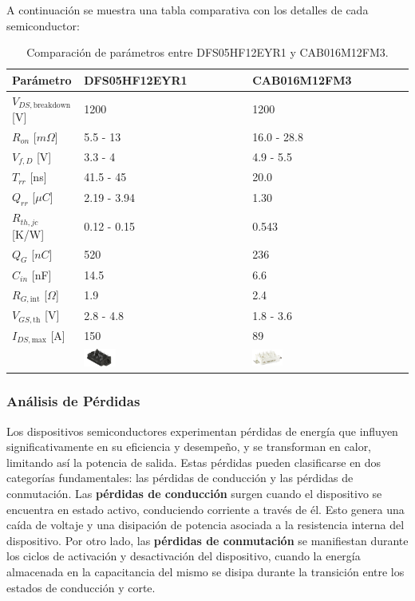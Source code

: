 A continuación se muestra una tabla comparativa con los detalles de cada semiconductor:
\begin{table}[H]
	\centering
	\begin{tabular}{|l|l|l|}
		\hline
		\textbf{Parámetro} & \textbf{DFS05HF12EYR1} & \textbf{CAB016M12FM3} \\ \hline
		\(V_{DS,\text{breakdown}}\) [V] & 1200 & 1200 \\ \hline
		\(R_{on}\) [\(m \Omega\)] & 5.5 - 13 & 16.0 - 28.8 \\ \hline
		\(V_{f,D}\) [V] & 3.3 - 4 & 4.9 - 5.5 \\ \hline
		\(T_{rr}\) [ns] & 41.5 - 45 & 20.0 \\ \hline
		\(Q_{rr}\) [\(\mu C\)] & 2.19 - 3.94 & 1.30 \\ \hline
		\(R_{th,jc}\) [K/W] & 0.12 - 0.15 & 0.543 \\ \hline
		\(Q_{G}\) [\(nC\)] & 520 & 236 \\ \hline
		\(C_{in}\) [nF] & 14.5 & 6.6 \\ \hline
		\(R_{G,\text{int}}\) [\(\Omega\)] & 1.9 & 2.4 \\ \hline
		\(V_{GS,\text{th}}\) [V] & 2.8 - 4.8 & 1.8 - 3.6 \\ \hline
		\(I_{DS,\text{max}}\) [A] & 150 & 89 \\ \hline
		& \includegraphics[width=0.2\textwidth]{fig/DFS05.png} & \includegraphics[width=0.2\textwidth]{fig/CAB016.png} \\
		\hline
	\end{tabular}
	\caption{Comparación de parámetros entre DFS05HF12EYR1 y CAB016M12FM3.}
\end{table}

\subsubsection{Análisis de Pérdidas}

Los dispositivos semiconductores experimentan pérdidas de energía que influyen significativamente en su eficiencia y desempeño, y se transforman en calor, limitando así la potencia de salida. Estas pérdidas pueden clasificarse en dos categorías fundamentales: las pérdidas de conducción y las pérdidas de conmutación. Las \textbf{pérdidas de conducción} surgen cuando el dispositivo se encuentra en estado activo, conduciendo corriente a través de él. Esto genera una caída de voltaje y una disipación de potencia asociada a la resistencia interna del dispositivo. Por otro lado, las \textbf{pérdidas de conmutación} se manifiestan durante los ciclos de activación y desactivación del dispositivo, cuando la energía almacenada en la capacitancia del mismo se disipa durante la transición entre los estados de conducción y corte.

